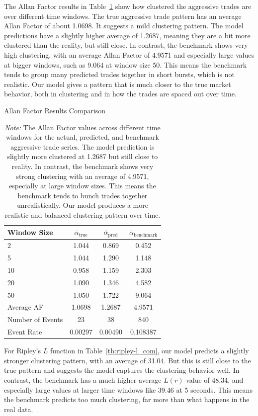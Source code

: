 The Allan Factor results in Table~\ref{tb:allan-factor_com} show how clustered the aggressive trades are over different time windows. The true aggressive trade pattern has an average Allan Factor of about 1.0698. It suggests a mild clustering pattern. The model predictions have a slightly higher average of 1.2687, meaning they are a bit more clustered than the reality, but still close. In contrast, the benchmark shows very high clustering, with an average Allan Factor of 4.9571 and especially large values at bigger windows, such as 9.064 at window size 50. This means the benchmark tends to group many predicted trades together in short bursts, which is not realistic. Our model gives a pattern that is much closer to the true market behavior, both in clustering and in how the trades are spaced out over time.
\begin{table}[H]
    \centering
    \caption{Allan Factor Results Comparison}
    \caption*{\textit{Note:} The Allan Factor values across different time windows for the actual, predicted, and benchmark aggressive trade series. The model prediction is slightly more clustered at 1.2687 but still close to reality. In contrast, the benchmark shows very strong clustering with an average of 4.9571, especially at large window sizes. This means the benchmark tends to bunch trades together unrealistically. Our model produces a more realistic and balanced clustering pattern over time.}

    \label{tb:allan-factor_com}
    \begin{tabular}{lccc}
    \toprule
    Window Size & $\bar{\alpha}_\text{true}$ & $\bar{\alpha}_\text{pred}$ & $\bar{\alpha}_\text{benchmark}$ \\
    \midrule
    2   & 1.044 & 0.869 & 0.452 \\
    5   & 1.044 & 1.290 & 1.148 \\
    10  & 0.958 & 1.159 & 2.303 \\
    20  & 1.090 & 1.346 & 4.582 \\
    50  & 1.050 & 1.722 & 9.064 \\
    \midrule
    Average AF & 1.0698 & 1.2687 & 4.9571 \\
    Number of Events & 23 & 38 & 840 \\
    Event Rate & 0.00297 & 0.00490 & 0.108387 \\
    \bottomrule
    \end{tabular}
\end{table}


For Ripley's \(L\) function in Table~\ref{tb:ripley-l_com}, our model predicts a slightly stronger clustering pattern, with an average of 31.04. But this is still close to the true pattern and suggests the model captures the clustering behavior well. In contrast, the benchmark has a much higher average \(L(r)\) value of 48.34, and especially large values at larger time windows like 39.46 at 5 seconds. This means the benchmark predicts too much clustering, far more than what happens in the real data. 

